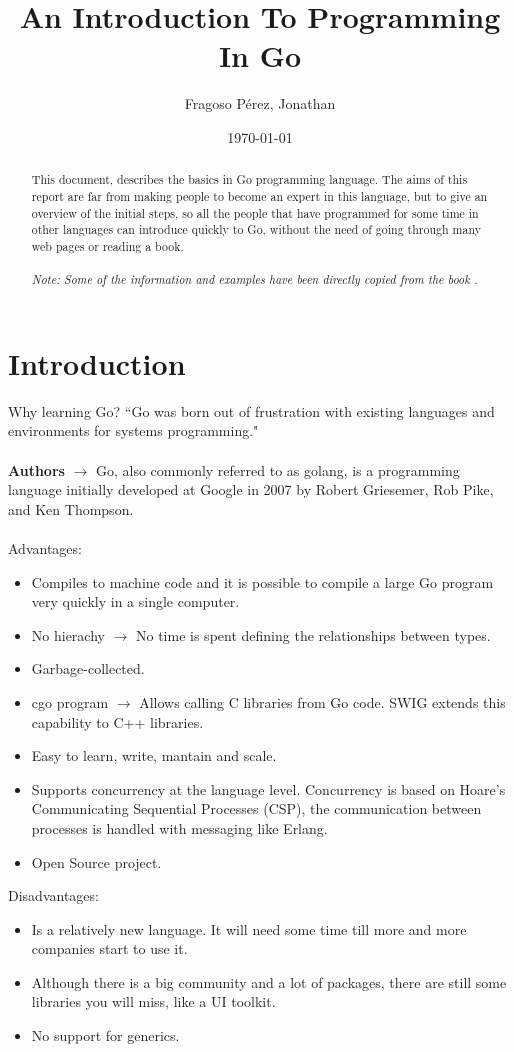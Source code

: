 \documentclass[twoside,a4paper,english]{report}
\title{An Introduction To Programming In Go}
\author{Fragoso Pérez, Jonathan}
\date{\today}
\begin{document}
\renewcommand{\abstractname}{Abstract}

\maketitle

\begin{abstract}
This document, describes the basics in Go programming language. The aims of this report are far from making people to become an expert in this language, but to give an overview of the initial steps, so all the people that have programmed for some time in other languages can introduce quickly to Go, without the need of going through many web pages or reading a book.\\\\
\emph{Note: Some of the information and examples have been directly copied from the book \cite{doxsey2012introduction}.}
\end{abstract}

\tableofcontents

\newpage
\chapter{Introduction}
Why learning Go? ``Go was born out of frustration with existing languages and environments for systems programming."\cite{gofaq}\\\\
\textbf{Authors} $\rightarrow$ Go, also commonly referred to as golang, is a programming language initially developed at Google in 2007 by Robert Griesemer, Rob Pike, and Ken Thompson.\\\\
Advantages:
\begin{itemize}
\item Compiles to machine code and it is possible to compile a large Go program very quickly in a single computer.
\item No hierachy $\rightarrow$ No time is spent defining the relationships between types.
\item Garbage-collected.
\item cgo program $\rightarrow$ Allows calling C libraries from Go code. SWIG extends this capability to C++ libraries.
\item Easy to learn, write, mantain and scale.
\item Supports concurrency at the language level. Concurrency is based on Hoare's Communicating Sequential Processes (CSP), the communication between processes is handled with messaging like Erlang. 
\item Open Source project.
\end{itemize}
Disadvantages:
\begin{itemize}
\item Is a relatively new language. It will need some time till more and more companies start to use it.
\item Although there is a big community and a lot of packages, there are still some libraries you will miss, like a UI toolkit.
\item No support for generics.
\end{itemize}
\end{document}
